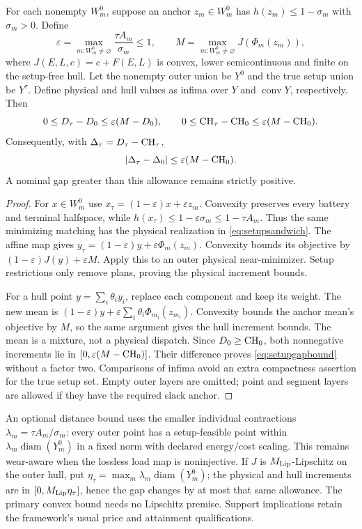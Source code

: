 \begin{proposition}\label{prop:setupslack}
For each nonempty $W_m^0$, suppose an anchor $z_m\in W_m^0$ has
$h(z_m)\le1-\sigma_m$ with $\sigma_m>0$. Define
\[
 \varepsilon=\max_{m:W_m^0\ne\varnothing}\frac{\tau A_m}{\sigma_m}
 \le1,\qquad
 M=\max_{m:W_m^0\ne\varnothing}J(\Phi_m(z_m)),
\]
where $J(E,L,c)=c+F(E,L)$ is convex, lower semicontinuous and finite
on the setup-free hull. Let the nonempty outer union be $Y^0$ and the
true setup union be $Y^\tau$. Define physical and hull values as infima
over $Y$ and $\operatorname{conv}Y$, respectively. Then
\[
 0\le D_\tau-D_0\le\varepsilon(M-D_0),\qquad
 0\le\mathrm{CH}_\tau-\mathrm{CH}_0\le\varepsilon(M-\mathrm{CH}_0).
\]
Consequently, with $\Delta_\tau=D_\tau-\mathrm{CH}_\tau$,
\begin{equation}\label{eq:setupgapbound}
 |\Delta_\tau-\Delta_0|\le\varepsilon(M-\mathrm{CH}_0).
\end{equation}
A nominal gap greater than this allowance remains strictly positive.
\end{proposition}

\begin{proof}
For $x\in W_m^0$ use $x_\tau=(1-\varepsilon)x+\varepsilon z_m$.
Convexity preserves every battery and terminal halfspace, while
$h(x_\tau)\le1-\varepsilon\sigma_m\le1-\tau A_m$.
Thus the same minimizing matching has the physical realization in
\eqref{eq:setupsandwich}. The affine map gives
$y_\tau=(1-\varepsilon)y+\varepsilon\Phi_m(z_m)$.
Convexity bounds its objective by $(1-\varepsilon)J(y)+\varepsilon M$.
Apply this to an outer physical near-minimizer. Setup restrictions only
remove plans, proving the physical increment bounds.

For a hull point $y=\sum_i\theta_i y_i$, replace each component and
keep its weight. The new mean is
$(1-\varepsilon)y+\varepsilon\sum_i\theta_i\Phi_{m_i}(z_{m_i})$.
Convexity bounds the anchor mean's objective by $M$, so the same argument
gives the hull increment bounds. The mean is a mixture, not a physical
dispatch. Since $D_0\ge\mathrm{CH}_0$, both nonnegative increments lie in
$[0,\varepsilon(M-\mathrm{CH}_0)]$. Their difference proves
\eqref{eq:setupgapbound} without a factor two. Comparisons of infima
avoid an extra compactness assertion for the true setup set. Empty
outer layers are omitted; point and segment layers are allowed if
they have the required slack anchor.
\end{proof}

An optional distance bound uses the smaller individual contractions
$\lambda_m=\tau A_m/\sigma_m$: every outer point has a setup-feasible
point within $\lambda_m\operatorname{diam}(Y_m^0)$ in a fixed norm
with declared energy/cost scaling. This remains wear-aware when the
lossless load map is noninjective. If $J$ is $M_{\rm Lip}$-Lipschitz
on the outer hull, put $\eta_\tau=\max_m\lambda_m
\operatorname{diam}(Y_m^0)$; the physical and hull increments are in
$[0,M_{\rm Lip}\eta_\tau]$, hence the gap changes by at most that
same allowance. The primary convex bound needs no Lipschitz premise.
Support implications retain the framework's usual price and attainment
qualifications.

